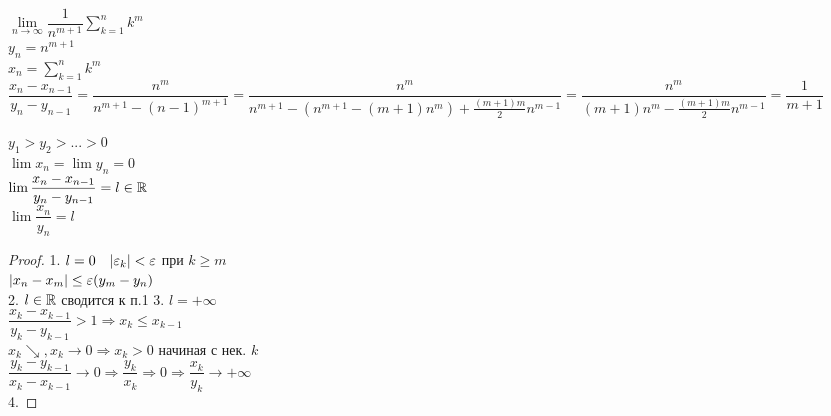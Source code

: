 $ \lim\limits_{n \rightarrow \infty} \dfrac{1}{n^{m+1}} \sum_{k=1}^{n} k^m $ \\
$ y_n = n^{m+1} $ \\
$ x_n = \sum_{k=1}^{n} k^m $ \\
$ \dfrac{x_n - x_{n-1}}{y_n - y_{n-1}} = \dfrac{n^m}{n^{m+1}- (n-1)^{m+1}} = \dfrac{n^m}{n^{m+1} - (n^{m+1} - (m+1)n^m) + \frac{(m+1)m}{2} n^{m-1}} = \dfrac{n^m}{(m+1) n^m - \frac{(m+1)m}{2} n^{m-1} } = \dfrac{1}{m+1} $ \\
	
	
\begin{theorem}
	$ y_1 > y_2 > ... > 0 $ \\
	$ \lim x_n = \lim y_n = 0 $ \\
	$ \lim \dfrac{x_n - x_{n-1}}{y_n - y_{n-1}} = l \in \mathbb{R} $ \\
	$ \lim \dfrac{x_n}{y_n} = l $ \\
	\begin{proof}
		1. $l = 0 \ \ \ | \varepsilon_k | < \varepsilon $ при $ k \geq m $ \\
		$ | x_n - x_m | \leq \varepsilon (y_m - y_n) $ \\
		2. $ l \in \mathbb{R} $ сводится к п.1
		3. $ l = + \infty $ \\
		$ \dfrac{ x_k - x_{k-1}}{y_k - y_{k-1}} > 1 \Rightarrow x_k \leq x_{k-1} $\\
		$ x_k \searrow, x_k \rightarrow 0 \Rightarrow x_k > 0$ начиная с нек. $k$ \\
		$ \dfrac{y_k - y_{k-1}}{x_k - x_{k-1}} \rightarrow 0 \Rightarrow \dfrac{y_k}{x_k} \Rightarrow 0 \Rightarrow \dfrac{x_k}{y_k} \rightarrow +\infty $\\
		4. 
 	\end{proof}
\end{theorem}



